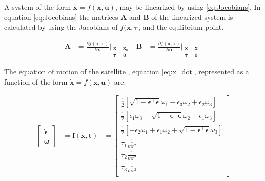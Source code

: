 A system of the form $\dot{\mathbf{x}} = f(\mathbf{x , u})$, may be linearized by using \eqref{eq:Jocobians}. In equation \eqref{eq:Jocobians} the matrices \textbf{A} and \textbf{B} of the linearized system is calculated by using the Jacobians of $f(\mathbf{x,\boldsymbol{\tau}}$, and the equlibrium point. 

\begin{equation}
    \begin{aligned}
        \mathbf{A}&= \frac{\partial f(\mathbf{x,\boldsymbol{\tau}})}{\partial \mathbf{x}}\Bigr|_{\substack{\mathbf{x}= \mathbf{x}_0 \\ \boldsymbol{\tau=0 }}} &
        \mathbf{B}&= \frac{\partial f(\mathbf{x,\boldsymbol{\tau}})}{\partial \mathbf{u}}\Bigr|_{\substack{\mathbf{x}= \mathbf{x}_0 \\ \boldsymbol{\tau=0 }}} 
    \end{aligned}
    \label{eq:Jocobians}
\end{equation}

The equation of motion of the satellite , equation \eqref{eq:x_dot}, represented as a function of the form $\dot{\mathbf{x}} = f(\mathbf{x , u})$ are:

\begin{equation}
    \begin{aligned}
    \begin{bmatrix}
		\dot{\boldsymbol{\epsilon}} \\
		\dot{\boldsymbol{\omega}}
    \end{bmatrix}
    &=
	\mathbf{f(\mathbf{x},t)} 
	&= 
	\begin{bmatrix}
		\frac{1}{2}[ \sqrt{1-\boldsymbol{\epsilon}^\top \boldsymbol{\epsilon}} \omega_1  - \epsilon_3 \omega_2 + \epsilon_2 \omega_3  ] \\
		\frac{1}{2}[ \epsilon_1 \omega_3 +  \sqrt{1-\boldsymbol{\epsilon}^\top \boldsymbol{\epsilon}} \omega_2  - \epsilon_1 \omega_3 ] \\
		\frac{1}{2}[  - \epsilon_2 \omega_1  + \epsilon_1 \omega_2 + \sqrt{1-\boldsymbol{\epsilon}^\top \boldsymbol{\epsilon}} \omega_3  ] \\
		\tau_1 \frac{1}{mr^2}\\
		\tau_2 \frac{1}{mr^2}\\
		\tau_3 \frac{1}{mr^2}\\
	\end{bmatrix}
	\label{eq:f}
	\end{aligned}
\end{equation}


